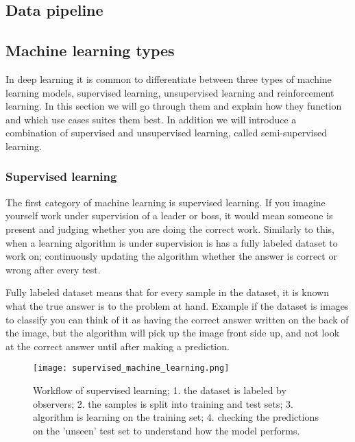 \documentclass[thesis.tex]{subfiles}
\begin{document}
\subsection{Data pipeline} %


\subsection{Machine learning types} \label{sec:machine_learning_types}
In deep learning it is common to differentiate between three types of machine learning models, supervised learning, unsupervised learning and reinforcement learning. In this section we will go through them and explain how they function and which use cases suites them best. In addition we will introduce a combination of supervised and unsupervised learning, called semi-supervised learning.

\subsubsection{Supervised learning} \label{sec:supervised_learnign}
The first category of machine learning is supervised learning. If you imagine yourself work under supervision of a leader or boss, it would mean someone is present and judging whether you are doing the correct work. Similarly to this, when a learning algorithm is under supervision is has a fully labeled dataset to work on; continuously updating the algorithm whether the answer is correct or wrong after every test.

Fully labeled dataset means that for every sample in the dataset, it is known what the true answer is to the problem at hand. Example if the dataset is images to classify you can think of it as having the correct answer written on the back of the image, but the algorithm will pick up the image front side up, and not look at the correct answer until after making a prediction.

\begin{figure}[h] %
  \begin{center}
    \texttt{[image: supervised\_machine\_learning.png]}
    \caption[Workflow of supervised machine learning.]{Workflow of supervised learning; 1. the dataset is labeled by observers; 2. the samples is split into training and test sets; 3. algorithm is learning on the training set; 4. checking the predictions on the 'unseen' test set to understand how the model performs.}
    \label{fig:supervised_machine_learning}
  \end{center}
\end{figure}
\end{document}

